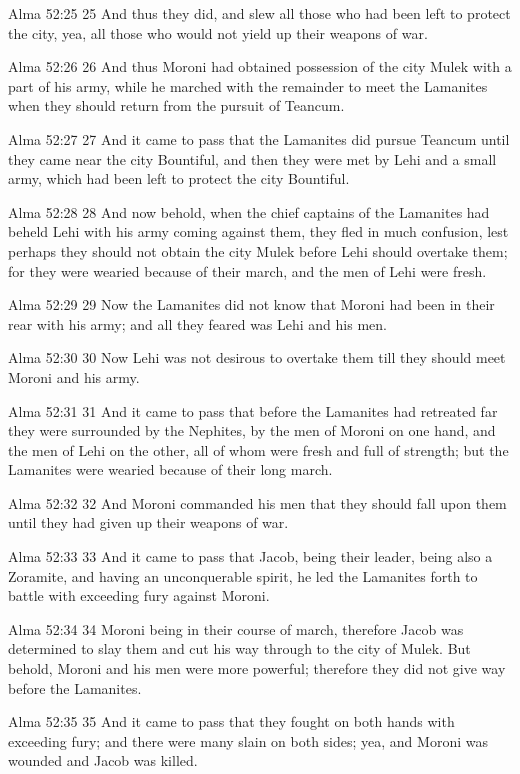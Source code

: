 Alma 52:25
 25 And thus they did, and slew all those who had been left to
protect the city, yea, all those who would not yield up their
weapons of war.

Alma 52:26
 26 And thus Moroni had obtained possession of the city Mulek
with a part of his army, while he marched with the remainder to
meet the Lamanites when they should return from the pursuit of
Teancum.

Alma 52:27
 27 And it came to pass that the Lamanites did pursue Teancum
until they came near the city Bountiful, and then they were met
by Lehi and a small army, which had been left to protect the city
Bountiful.

Alma 52:28
 28 And now behold, when the chief captains of the Lamanites had
beheld Lehi with his army coming against them, they fled in much
confusion, lest perhaps they should not obtain the city Mulek
before Lehi should overtake them; for they were wearied because
of their march, and the men of Lehi were fresh.

Alma 52:29
 29 Now the Lamanites did not know that Moroni had been in their
rear with his army; and all they feared was Lehi and his men.

Alma 52:30
 30 Now Lehi was not desirous to overtake them till they should
meet Moroni and his army.

Alma 52:31
 31 And it came to pass that before the Lamanites had retreated
far they were surrounded by the Nephites, by the men of Moroni on
one hand, and the men of Lehi on the other, all of whom were
fresh and full of strength; but the Lamanites were wearied
because of their long march.

Alma 52:32
 32 And Moroni commanded his men that they should fall upon them
until they had given up their weapons of war.

Alma 52:33
 33 And it came to pass that Jacob, being their leader, being
also a Zoramite, and having an unconquerable spirit, he led the
Lamanites forth to battle with exceeding fury against Moroni.

Alma 52:34
 34 Moroni being in their course of march, therefore Jacob was
determined to slay them and cut his way through to the city of
Mulek. But behold, Moroni and his men were more powerful;
therefore they did not give way before the Lamanites.

Alma 52:35
 35 And it came to pass that they fought on both hands with
exceeding fury; and there were many slain on both sides; yea, and
Moroni was wounded and Jacob was killed.

